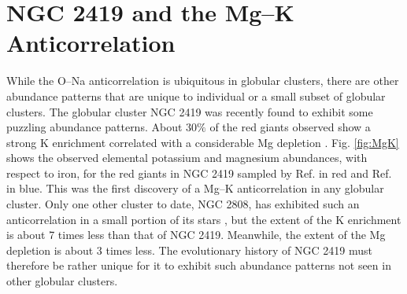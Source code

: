 
\section{NGC 2419 and the Mg--K Anticorrelation}



While the O--Na anticorrelation is ubiquitous in globular clusters, there are other abundance patterns that are unique to individual or a small subset of globular clusters. The globular cluster NGC 2419 was recently found to exhibit some puzzling abundance patterns. About 30$\%$ of the red giants observed show a strong K enrichment correlated with a considerable Mg depletion \cite{Mucciarelli2012,Cohen2012}. Fig. \ref{fig:MgK} shows the observed elemental potassium and magnesium abundances, with respect to iron, for the red giants in NGC 2419 sampled by Ref. \cite{Mucciarelli2012} in red and Ref. \cite{Cohen2012} in blue. This was the first discovery of a Mg--K anticorrelation in any globular cluster. Only one other cluster to date, NGC 2808, has exhibited such an anticorrelation in a small portion of its stars \cite{Mucciarelli2015,Mucciarelli2017}, but the extent of the K enrichment is about 7 times less than that of NGC 2419. Meanwhile, the extent of the Mg depletion is about 3 times less. The evolutionary history of NGC 2419 must therefore be rather unique for it to exhibit such abundance patterns not seen in other globular clusters.


